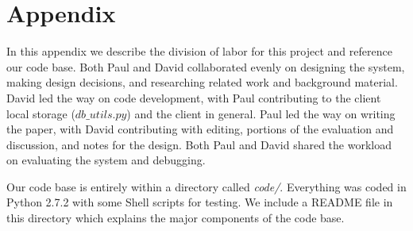 \newpage
\section{Appendix}
\label{appendix}
In this appendix we describe the division of labor for this project and reference our code base.
Both Paul and David collaborated evenly on designing the system,
making design decisions,
and researching related work and background material.
David led the way on code development,
with Paul contributing to the client local storage ($db\_utils.py$)
and the client in general.
Paul led the way on writing the paper, with
David contributing with editing, portions of the evaluation and discussion,
and notes for the design.
Both Paul and David shared the workload on evaluating the system and debugging.

Our code base is entirely within a directory called \emph{code/}.
Everything was coded in Python 2.7.2 with some Shell scripts for testing.
We include a README file in this directory which explains the major components
of the code base.
